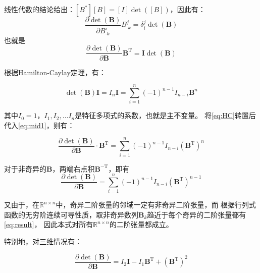 \documentclass[UTF8,zihao=5]{ctexart}
\newcommand{\bm}[1]{{\mathbf{#1}}}
\newcommand{\trans}[0]{^\mathrm{T}}
\newcommand*{\pd}[2]{\frac{\partial #1}{\partial #2}}
\begin{document}
线性代数的结论给出：$[B^*][B]=[I]\det([B])$，因此有：
$$
\pd{\det(\bm{B})}{B^i_{\cdot k}}B^j_{\cdot k}=\delta_i^j\det(\bm{B})
$$
也就是
\begin{equation}
    \pd{\det(\bm{B})}{\bm{B}}\bm{B}\trans=\bm{I}\det(\bm{B})
    \label{eq:mid1}
\end{equation}

根据Hamilton-Caylay定理，有：

\begin{equation}
    \det(\bm{B})\bm{I}=I_n\bm{I}=\sum_{i=1}^n{(-1)^{n-1}I_{n-i}\bm{B}^n}
    \label{eq:HC}
\end{equation}

其中$I_0=1$，$I_1,I_2,\dots I_n$是特征多项式的系数，也就是主不变量。
将\eqref{eq:HC}转置后代入\eqref{eq:mid1}，则有：

\begin{equation}
    \pd{\det(\bm{B})}{\bm{B}}\cdot\bm{B}\trans=\sum_{i=1}^n{(-1)^{n-1}I_{n-i}(\bm{B}\trans)^n}
\end{equation}

对于非奇异的$\bm{B}$，两端右点积$\bm{B}^{-\mathrm{T}}$，即有
\begin{equation}
    \pd{\det(\bm{B})}{\bm{B}}=\sum_{i=1}^n{(-1)^{n-1}I_{n-i}(\bm{B}\trans)^{n-1}}
    \label{eq:result}
\end{equation}

又由于，在$\mathbb{R}^{n\times n}$中，奇异二阶张量的邻域一定有非奇异二阶张量，而
根据行列式函数的无穷阶连续可导性质，取非奇异数列$\bm{B}_k$趋近于每个奇异的二阶张量都有\eqref{eq:result}，
因此本式对所有$\mathbb{R}^{n\times n}$的二阶张量都成立。

特别地，对三维情况有：

$$
\pd{\det(\bm{B})}{\bm{B}}=I_2\bm{I}-I_1\bm{B}\trans+(\bm{B}\trans)^2
$$
\end{document}
